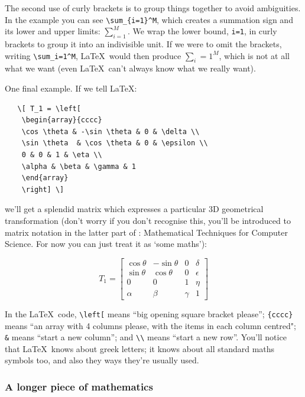 \begin{refsection}
The second use of curly brackets is to group things together to avoid ambiguities. In the example you can see \verb|\sum_{i=1}^M|, which creates a summation sign and its lower and upper limits: \( \sum_{i=1}^{M} \). We wrap the lower bound, \verb|i=1|, in curly brackets to group it into an indivisible unit. If we were to omit the brackets, writing \verb|\sum_i=1^M|, \LaTeX\ would then produce \( \sum_i=1^M \), which is not at all what we want (even \LaTeX\ can't always know what we really want).

One final example. If we tell \LaTeX:

\begin{verbatim}
   \[ T_1 = \left[
    \begin{array}{cccc}
    \cos \theta & -\sin \theta & 0 & \delta \\
    \sin \theta  & \cos \theta & 0 & \epsilon \\
    0 & 0 & 1 & \eta \\
    \alpha & \beta & \gamma & 1
    \end{array}
    \right] \]
\end{verbatim}
%
we'll get a splendid matrix which expresses a particular 3D geometrical transformation (don't worry if you don't recognise this, you'll be introduced to matrix notation in the latter part of : Mathematical Techniques for Computer Science. For now you can just treat it as `some maths'):

\[   T_1 = \left[
    \begin{array}{cccc}
    \cos \theta & -\sin \theta & 0 & \delta \\
    \sin \theta  & \cos \theta & 0 & \epsilon \\
    0 & 0 & 1 & \eta \\
    \alpha & \beta & \gamma & 1
    \end{array}
    \right]
\]
%

In the \LaTeX\ code,  \verb|\left[| means ``big opening square bracket please'';  \verb|{cccc}| means ``an array with 4 columns please, with the items in each column centred"; \verb|&| means ``start a new column''; and \verb|\\| means ``start a new row''. You'll notice that \LaTeX\ knows about  greek letters; it knows about all standard maths symbols too, and also they ways  they're usually used.


\subsubsection{A longer piece of mathematics}
\label{sec:longer-piece-maths}


\end{refsection}
